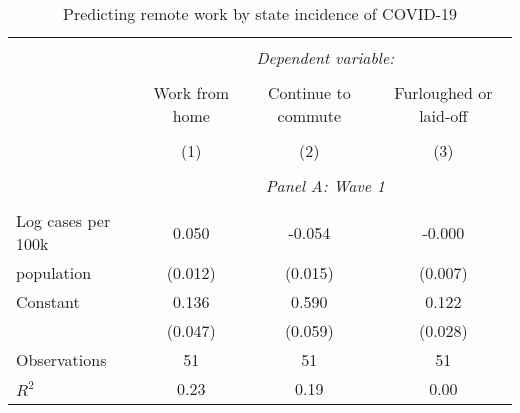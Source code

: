 \begin{table}[!htbp] \centering                    \caption{Predicting remote work by state incidence of COVID-19}                    \label{tab:remotework}                  \small                  \begin{tabular}{@{\extracolsep{5pt}}lccc}                  \\[-1.8ex]\hline                  \hline \\[-1.8ex]                   & \multicolumn{3}{c}{\textit{Dependent variable:}} \\                   \cline{2-4}                   \\[-1.8ex] & Work from home & Continue to commute & Furloughed or laid-off \\                   \hline \\[-1.8ex]               
                    &\multicolumn{1}{c}{(1)}         &\multicolumn{1}{c}{(2)}         &\multicolumn{1}{c}{(3)}         \\
\hline \\               & \multicolumn{3}{c}{\textit{Panel A: Wave 1}} \\               \addlinespace[1mm] \\
Log cases per 100k  &       0.050\sym{***}&      -0.054\sym{***}&      -0.000         \\
population          &     (0.012)         &     (0.015)         &     (0.007)         \\
[1em]
Constant            &       0.136\sym{***}&       0.590\sym{***}&       0.122\sym{***}\\
                    &     (0.047)         &     (0.059)         &     (0.028)         \\
[1em]
Observations        &          51         &          51         &          51         \\
\(R^{2}\)           &        0.23         &        0.19         &        0.00         \\


\end{tabular}
\end{table}

